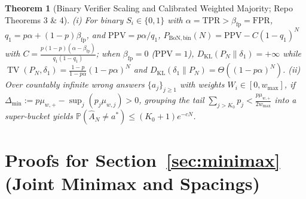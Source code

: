 \documentclass{article}
\theoremstyle{plain}
\newtheorem{theorem}{Theorem}
\theoremstyle{definition}
\theoremstyle{remark}
\newcommand{\Prob}{\mathbb{P}}
\newcommand{\DKL}{D_{\mathrm{KL}}}
\newcommand{\TV}{\operatorname{TV}}
\begin{document}
\begin{theorem}[Binary Verifier Scaling and Calibrated Weighted Majority; Repo Theorems 3 \& 4]
\label{thm:app-cal}
(i) For binary $S_i \in \{0,1\}$ with $\alpha = \mathrm{TPR} > \beta_{\mathrm{fp}} = \mathrm{FPR}$, $q_1 = p\alpha + (1-p)\beta_{\mathrm{fp}}$, and $\mathrm{PPV} = p\alpha/q_1$, $P_{\mathrm{BoN,bin}}(N) = \mathrm{PPV} - C(1-q_1)^N$ with $C = \frac{p(1-p)(\alpha-\beta_{\mathrm{fp}})}{q_1(1-q_1)}$; when $\beta_{\mathrm{fp}} = 0$ ($\mathrm{PPV}=1$), $\DKL(P_N \| \delta_1) = +\infty$ while $\TV(P_N, \delta_1) = \frac{1-p}{1-p\alpha}(1-p\alpha)^N$ and $\DKL(\delta_1 \| P_N) = \Theta((1-p\alpha)^N)$. (ii) Over countably infinite wrong answers $\{a_j\}_{j\ge 1}$ with weights $W_i \in [0, w_{\max}]$, if $\Delta_{\min} := p\mu_{w,+} - \sup_j(p_j\mu_{w,j}) > 0$, grouping the tail $\sum_{j>K_0}p_j < \frac{p\mu_{w,+}}{2w_{\max}}$ into a super-bucket yields $\Prob(\hat{A}_N \neq a^*) \le (K_0+1)e^{-c N}$.
\end{theorem}

\section{Proofs for Section~\texorpdfstring{\ref{sec:minimax}}{4} (Joint Minimax and Spacings)}
\label{app:minimax}
\end{document}

